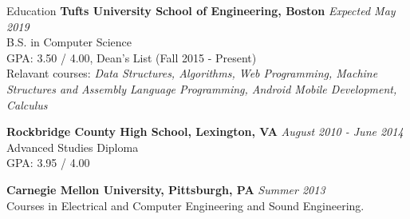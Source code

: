 \documentclass{resume}
\begin{document}
  \begin{rSection}{Education}
    {\bf Tufts University School of Engineering, Boston} \hfill {\em Expected May 2019} \\ 
    { B.S. in Computer Science} \\
    GPA: 3.50 / 4.00, Dean's List (Fall 2015 - Present)\\
    Relavant courses: \textit{Data Structures, Algorithms, Web Programming, Machine Structures and Assembly Language Programming, Android Mobile Development, Calculus}
    
    {\bf Rockbridge County High School, Lexington, VA} \hfill {\em  August 2010 - June 2014} \\ 
    Advanced Studies Diploma \\
    GPA: 3.95 / 4.00
    
    {\bf Carnegie Mellon University, Pittsburgh, PA} \hfill {\em  Summer 2013} \\ 
    Courses in Electrical and Computer Engineering and Sound Engineering.
  \end{rSection}
  
\end{document}
